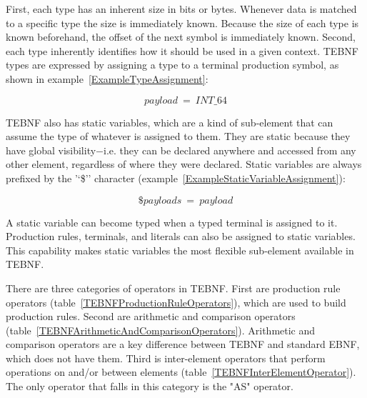 \indent
First, each type has an inherent size in bits or bytes.  Whenever data is matched to a specific type the size is immediately known.  Because the size of each type is known beforehand, the offset of the next symbol is immediately known.  Second, each type inherently identifies how it should be used in a given context.  TEBNF types are expressed by assigning a type to a terminal production symbol, as shown in example~\ref{ExampleTypeAssignment}:

\begin{equation}
payload\ =\ INT\_64
\label{ExampleTypeAssignment}
\end{equation}

\indent
TEBNF also has static variables, which are a kind of sub-element that can assume the type of whatever is assigned to them.  They are static because they have global visibility$-$i.e. they can be declared anywhere and accessed from any other element, regardless of where they were declared.  Static variables are always prefixed by the '‘\$'’ character (example~\ref{ExampleStaticVariableAssignment}):

\begin{equation}
\$payloads\ =\ payload
\label{ExampleStaticVariableAssignment}
\end{equation}

\indent
A static variable can become typed when a typed terminal is assigned to it.  Production rules, terminals, and literals can also be assigned to static variables.  This capability makes static variables the most flexible sub-element available in TEBNF.

\label{sec:TEBNFOperators}
There are three categories of operators in TEBNF.  First are production rule operators (table~\ref{TEBNFProductionRuleOperators}), which are used to build production rules.  Second are arithmetic and comparison operators (table~\ref{TEBNFArithmeticAndComparisonOperators}).  Arithmetic and comparison operators are a key difference between TEBNF and standard EBNF, which does not have them.  Third is inter-element operators that perform operations on and/or between elements (table~\ref{TEBNFInterElementOperator}).  The only operator that falls in this category is the "AS" operator.


